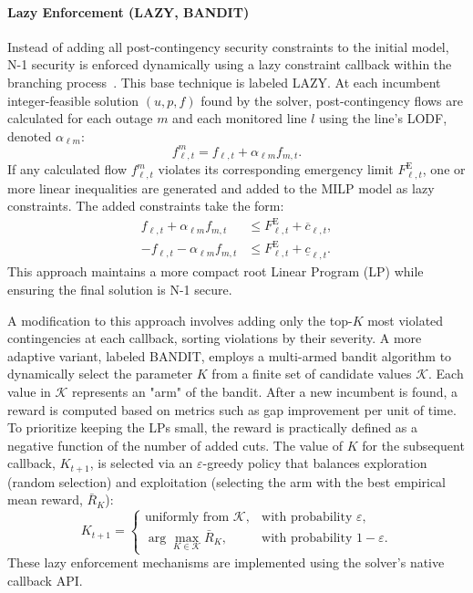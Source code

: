 \documentclass{ieeeaccess}
\begin{document}
\paragraph{Lazy Enforcement (LAZY, BANDIT)}
Instead of adding all post-contingency security constraints to the initial model, N-1 security is enforced dynamically using a lazy constraint callback within the branching process~\cite{Castelli2024b, Qiu2022}. This base technique is labeled LAZY. At each incumbent integer-feasible solution $(u,p,f)$ found by the solver, post-contingency flows are calculated for each outage $m$ and each monitored line 
$l$ using the line's LODF, denoted $\alpha_{\ell m}$:
\begin{equation}
f^{m}_{\ell,t}=f_{\ell,t}+\alpha_{\ell m} f_{m,t}.
\end{equation}
If any calculated flow $f^{m}_{\ell,t}$ violates its corresponding emergency limit $F^{\mathrm{E}}_{\ell,t}$, one or more linear inequalities are generated and added to the MILP model as lazy constraints. The added constraints take the form:
\begin{align}
f_{\ell,t}+\alpha_{\ell m} f_{m,t} &\le F^{\mathrm{E}}_{\ell,t}+\overline{c}_{\ell,t}, \\
-f_{\ell,t}-\alpha_{\ell m} f_{m,t} &\le F^{\mathrm{E}}_{\ell,t}+\underline{c}_{\ell,t}.
\end{align}
This approach maintains a more compact root Linear Program (LP) while ensuring the final solution is N-1 secure.

A modification to this approach involves adding only the top-$K$ most violated contingencies at each callback, sorting violations by their severity. A more adaptive variant, labeled BANDIT, employs a multi-armed bandit algorithm to dynamically select the parameter $K$ from a finite set of candidate values $\mathcal{K}$. Each value in $\mathcal{K}$ represents an "arm" of the bandit. After a new incumbent is found, a reward is computed based on metrics such as gap improvement per unit of time. To prioritize keeping the LPs small, the reward is practically defined as a negative function of the number of added cuts. The value of $K$ for the subsequent callback, $K_{t+1}$, is selected via an $\varepsilon$-greedy policy that balances exploration (random selection) and exploitation (selecting the arm with the best empirical mean reward, $\bar{R}_K$):
\begin{equation}
K_{t+1}=\begin{cases}
\text{uniformly from }\mathcal{K}, & \text{with probability }\varepsilon, \\
\arg\max_{K\in\mathcal{K}}\bar{R}_K, & \text{with probability }1-\varepsilon.
\end{cases}
\end{equation}
These lazy enforcement mechanisms are implemented using the solver's native callback API.
\end{document}
